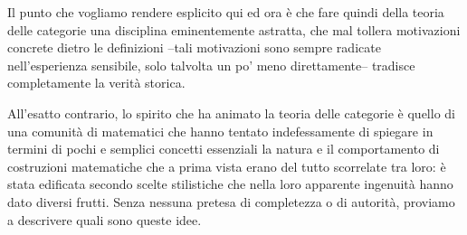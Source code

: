 Il punto che vogliamo rendere esplicito qui ed ora è che fare quindi della teoria delle categorie una disciplina eminentemente astratta, che mal tollera motivazioni concrete dietro le definizioni --tali motivazioni sono sempre radicate nell'esperienza sensibile, solo talvolta un po' meno direttamente-- tradisce completamente la verità storica.

All'esatto contrario, lo spirito che ha animato la teoria delle categorie è quello di una comunità di matematici che hanno tentato indefessamente di spiegare in termini di pochi e semplici concetti essenziali la natura e il comportamento di costruzioni matematiche che a prima vista erano del tutto scorrelate tra loro: è stata edificata secondo scelte stilistiche che nella loro apparente ingenuità hanno dato diversi frutti. Senza nessuna pretesa di completezza o di autorità, proviamo a descrivere quali sono queste idee.

